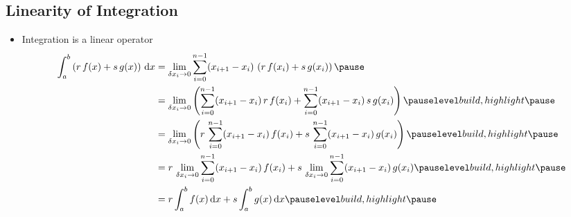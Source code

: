 
\begin{slide}
\section[-2]{Linearity of Integration}

\begin{PauseHighLight}
  \begin{itemize}
  \item Integration is a linear operator
    {\small
    \begin{align*}
      \int_a^b \bra{r\,f(x) + s\,g(x)} \, \dd x
      &= \lim\limits_{\delta x_i\rightarrow 0} \sum_{i=0}^{n-1}
                                    (x_{i+1} - x_i) \, \bra{r\,f(x_i)
        + s\,g(x_i)} \pause \\
      &= \lim\limits_{\delta x_i\rightarrow 0} \bra{
        \sum_{i=0}^{n-1} (x_{i+1} - x_i) \, r\,f(x_i)
        + \sum_{i=0}^{n-1} (x_{i+1} - x_i) \, s\,g(x_i)} \pauseb \\
      &= \lim\limits_{\delta x_i\rightarrow 0} \bra{
        r\,\sum_{i=0}^{n-1} (x_{i+1} - x_i) \, f(x_i)
        + s\, \sum_{i=0}^{n-1} (x_{i+1} - x_i) \, g(x_i)} \pauseb \\
        &=  r\, \lim\limits_{\delta x_i\rightarrow 0} \sum_{i=0}^{n-1}
          (x_{i+1} - x_i) \, f(x_i)
          +  s\, \lim\limits_{\delta x_i\rightarrow 0} \sum_{i=0}^{n-1}
          (x_{i+1} - x_i) \, g(x_i) \pauseb \\
      &= r \int_a^b f(x) \, \mathrm{d}x + s \int_a^b g(x) \, \mathrm{d}x\pauseb
    \end{align*}}
  \end{itemize}
\end{PauseHighLight}

\end{slide}


